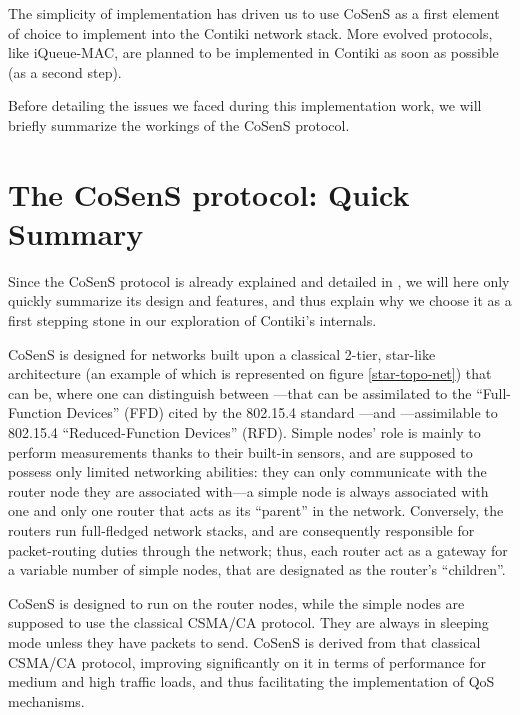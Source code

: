\documentclass[12pt,a4paper]{article}
\begin{document}
The simplicity of implementation has driven us to use CoSenS as a first
element of choice to implement into the Contiki network stack.
More evolved protocols, like iQueue-MAC, are planned to be implemented
in Contiki as soon as possible (as a second step).

Before detailing the issues we faced during this implementation work,
we will briefly summarize the workings of the CoSenS protocol.


\section{The CoSenS protocol: Quick Summary}

Since the CoSenS protocol is already explained and detailed in \cite{cosens},
we will here only quickly summarize its design and features, and thus explain
why we choose it as a first stepping stone in our exploration of Contiki's
internals.

CoSenS is designed for networks built upon a classical 2-tier, star-like
architecture (an example of which is represented on figure \ref{star-topo-net})
that can be, where one can distinguish between ---that
can be assimilated to the ``Full-Function Devices'' (FFD) cited by
the 802.15.4 standard \cite{std802154}---and ---assimilable to 802.15.4 ``Reduced-Function Devices'' (RFD).
Simple nodes' role is mainly to perform measurements thanks to their
built-in sensors, and are supposed to possess only limited networking
abilities: they can only communicate with the router node they are
associated with---a simple node is always associated with one and only
one router that acts as its ``parent'' in the network. Conversely,
the routers run full-fledged network stacks, and are consequently
responsible for packet-routing duties through the network; thus,
each router act as a gateway for a variable number of simple nodes,
that are designated as the router's ``children''.

CoSenS is designed to run on the router nodes, while the simple nodes
are supposed to use the classical CSMA/CA protocol. They are always
in sleeping mode unless they have packets to send.
CoSenS is derived from that classical CSMA/CA protocol, improving
significantly on it in terms of performance for medium and high traffic
loads, and thus facilitating the implementation of QoS mechanisms.
\end{document}
